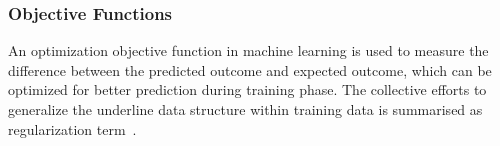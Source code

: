 \subsubsection{Objective Functions}
An optimization objective function in machine learning is used to measure the difference between the predicted outcome and expected outcome, which can be optimized for better prediction during training phase. The collective efforts to generalize the underline data structure within training data is summarised as regularization term~\cite{goodfellow_2015}.  